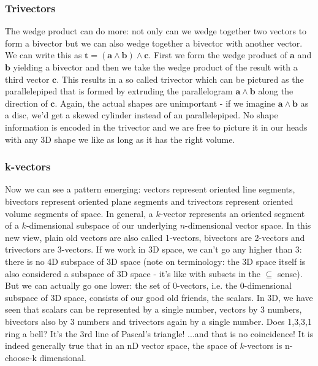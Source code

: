 \subsubsection{Trivectors}
The wedge product can do more: not only can we wedge together two vectors to form a bivector but we can also wedge together a bivector with another vector. We can write this as $\mathbf{t = (a \wedge b) \wedge c}$. First we form the wedge product of $\mathbf{a}$ and  $\mathbf{b}$ yielding a bivector and then we take the wedge product of the result with a third vector $\mathbf{c}$. This results in a so called trivector which can be pictured as the parallelepiped that is formed by extruding the parallelogram $\mathbf{a \wedge b}$ along the direction of $\mathbf{c}$. Again, the actual shapes are unimportant - if we imagine $\mathbf{a \wedge b}$ as a disc, we'd get a skewed cylinder instead of an parallelepiped. No shape information is encoded in the trivector and we are free to picture it in our heads with any 3D shape we like as long as it has the right volume.

\subsubsection{k-vectors}
Now we can see a pattern emerging: vectors represent oriented line segments, bivectors represent oriented plane segments and trivectors represent oriented volume segments of space. In general, a $k$-vector represents an oriented segment of a $k$-dimensional subspace of our underlying $n$-dimensional vector space. In this new view, plain old vectors are also called 1-vectors, bivectors are 2-vectors and trivectors are 3-vectors. If we work in 3D space, we can't go any higher than 3: there is no 4D subspace of 3D space (note on terminology: the 3D space itself is also considered a subspace of 3D space - it's like with subsets in the $\subseteq$ sense). But we can actually go one lower: the set of 0-vectors, i.e. the 0-dimensional subspace of 3D space, consists of our good old friends, the scalars. In 3D, we have seen that scalars can be represented by a single number, vectors by 3 numbers, bivectors also by 3 numbers and trivectors again by a single number. Does 1,3,3,1 ring a bell? It's the 3rd line of Pascal's triangle! ...and that is no coincidence! It is indeed generally true that in an nD vector space, the space of $k$-vectors is n-choose-k dimensional.

